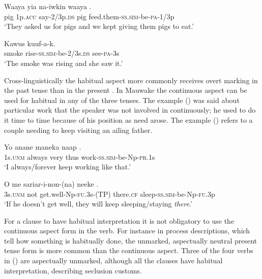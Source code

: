 \ea%
\label{ex:x354}
\gll Waaya yia na-iwkin waaya . \\
pig 1p.\textsc{acc} say-2/3p.\textsc{ds} pig feed.them-\textsc{ss}.\textsc{sim}-be-\textsc{pa}-1/3p\\
\glt`They asked us for pigs and we kept giving them pigs to eat.'
\z

\ea%
\label{ex:x355}
\gll Kawus  kuuf-a-k. \\
smoke rise-\textsc{ss}.\textsc{sim}-be-2/3s.\textsc{ds} see-\textsc{pa}-3s\\
\glt`The smoke was rising and she saw it.'
\z

Cross-linguistically the habitual aspect more commonly receives overt marking in the past tense than in the present \citep[154]{Cristofaro2006}. In Mauwake the continuous aspect can be used for habitual in any of the three tenses. The example () was said about particular work that the speaker was not involved in continuously; he used to do it time to time because of his position as need arose. The example () refers to a couple needing to keep visiting an ailing father. 

\ea%
\label{ex:x1063}
\gll Yo anane maneka naap . \\
1s.\textsc{unm} always very thus work-\textsc{ss}.\textsc{sim}-be-Np-\textsc{pr}.1s\\
\glt`I always/forever keep working like that.'
\z

\ea%
\label{ex:x1064}
\gll O me sariar-i-non-(na) neeke . \\
3s.\textsc{unm} not get.well-Np-\textsc{fu}.3s-(TP) there.\textsc{cf} sleep-\textsc{ss}.\textsc{sim}-be-Np-\textsc{fu}.3p\\
\glt`If he doesn't get well, they will keep sleeping/staying \textit{there}.' 
\z

For a clause to have habitual interpretation it is not obligatory to use the continuous aspect form in the verb. For instance in process descriptions, which tell how something is habitually done, the unmarked, aspectually neutral present tense form is more common than the continuous aspect. Three of the four verbs in () are aspectually unmarked, although all the clauses have habitual interpretation, describing seclusion customs.

